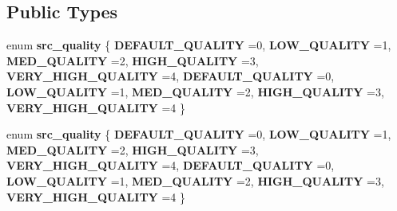 \subsection*{Public Types}
\begin{DoxyCompactItemize}
\item 
\mbox{\label{classcocos2d_1_1experimental_1_1AudioResampler_a9e5b00a4eec48bea552a7e572f905481}} 
enum {\bfseries src\+\_\+quality} \{ \newline
{\bfseries D\+E\+F\+A\+U\+L\+T\+\_\+\+Q\+U\+A\+L\+I\+TY} =0, 
{\bfseries L\+O\+W\+\_\+\+Q\+U\+A\+L\+I\+TY} =1, 
{\bfseries M\+E\+D\+\_\+\+Q\+U\+A\+L\+I\+TY} =2, 
{\bfseries H\+I\+G\+H\+\_\+\+Q\+U\+A\+L\+I\+TY} =3, 
\newline
{\bfseries V\+E\+R\+Y\+\_\+\+H\+I\+G\+H\+\_\+\+Q\+U\+A\+L\+I\+TY} =4, 
{\bfseries D\+E\+F\+A\+U\+L\+T\+\_\+\+Q\+U\+A\+L\+I\+TY} =0, 
{\bfseries L\+O\+W\+\_\+\+Q\+U\+A\+L\+I\+TY} =1, 
{\bfseries M\+E\+D\+\_\+\+Q\+U\+A\+L\+I\+TY} =2, 
\newline
{\bfseries H\+I\+G\+H\+\_\+\+Q\+U\+A\+L\+I\+TY} =3, 
{\bfseries V\+E\+R\+Y\+\_\+\+H\+I\+G\+H\+\_\+\+Q\+U\+A\+L\+I\+TY} =4
 \}
\item 
\mbox{\label{classcocos2d_1_1experimental_1_1AudioResampler_a9e5b00a4eec48bea552a7e572f905481}} 
enum {\bfseries src\+\_\+quality} \{ \newline
{\bfseries D\+E\+F\+A\+U\+L\+T\+\_\+\+Q\+U\+A\+L\+I\+TY} =0, 
{\bfseries L\+O\+W\+\_\+\+Q\+U\+A\+L\+I\+TY} =1, 
{\bfseries M\+E\+D\+\_\+\+Q\+U\+A\+L\+I\+TY} =2, 
{\bfseries H\+I\+G\+H\+\_\+\+Q\+U\+A\+L\+I\+TY} =3, 
\newline
{\bfseries V\+E\+R\+Y\+\_\+\+H\+I\+G\+H\+\_\+\+Q\+U\+A\+L\+I\+TY} =4, 
{\bfseries D\+E\+F\+A\+U\+L\+T\+\_\+\+Q\+U\+A\+L\+I\+TY} =0, 
{\bfseries L\+O\+W\+\_\+\+Q\+U\+A\+L\+I\+TY} =1, 
{\bfseries M\+E\+D\+\_\+\+Q\+U\+A\+L\+I\+TY} =2, 
\newline
{\bfseries H\+I\+G\+H\+\_\+\+Q\+U\+A\+L\+I\+TY} =3, 
{\bfseries V\+E\+R\+Y\+\_\+\+H\+I\+G\+H\+\_\+\+Q\+U\+A\+L\+I\+TY} =4
 \}
\end{DoxyCompactItemize}

